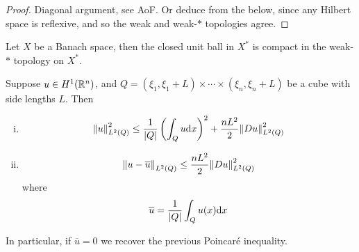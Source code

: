 \documentclass{article}
\begin{document}
\begin{proof}
    Diagonal argument, see AoF. Or deduce from the below, since any Hilbert space is reflexive, and so the weak and weak-\(*\) topologies agree.
\end{proof}

\begin{theorem}
    Let \(X\) be a Banach space, then the closed unit ball in \(X^*\) is compact in the weak-\(*\) topology on \(X^*\).
\end{theorem}

\begin{lemma}
    Suppose \(u \in H^1(\mathbb{R}^n)\), and \(Q = (\xi_1, \xi_1 + L) \times \cdots \times (\xi_n, \xi_n + L)\) be a cube with side lengths \(L\). Then
    \begin{enumerate}[(i)]
        \item \[\norm{u}_{L^2(Q)}^2 \le \frac{1}{\abs{Q}}\left(\int_Q u \dd x\right)^2 + \frac{nL^2}{2}\norm{Du}^2_{L^2(Q)}\]
        \item \[\norm{u - \overline u}_{L^2(Q)} \le \frac{nL^2}{2}\norm{Du}^2_{L^2(Q)}\]
        where
        \[\overline u = \frac{1}{\abs{Q}}\int_Q u(x)\dd x\]
    \end{enumerate}
    In particular, if \(\overline u = 0\) we recover the previous Poincar\'e inequality.
\end{lemma}
\end{document}
